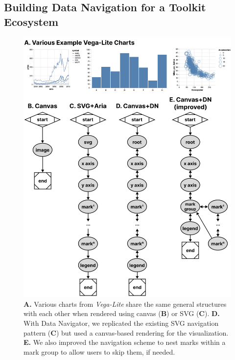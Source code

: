 \documentclass[journal]{vgtc}                %
\begin{document}
\subsection{Building Data Navigation for a Toolkit Ecosystem}
\label{section:ecosystem}
\begin{figure}[h]
  \centering
  \includegraphics[width=\linewidth]{figures/vega-lite.png}
  \caption{\textbf{A.} Various charts from \textit{Vega-Lite} share the same general structures with each other when rendered using canvas (\textbf{B}) or SVG (\textbf{C}). \textbf{D.} With Data Navigator, we replicated the existing SVG navigation pattern (\textbf{C}) but used a canvas-based rendering for the visualization. \textbf{E.} We also improved the navigation scheme to nest marks within a mark group to allow users to skip them, if needed.}
  \label{vega-lite}
\end{figure}
\end{document}
